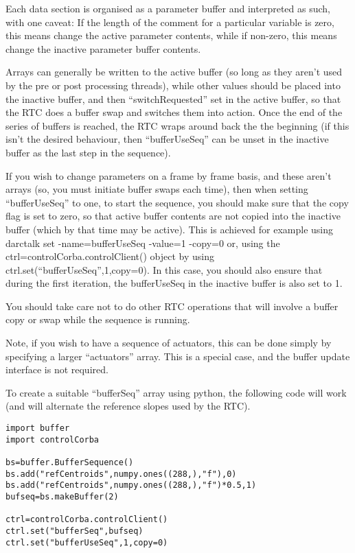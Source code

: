 \documentclass[a4,10pt]{article}
\begin{document}
Each data section is organised as a parameter buffer and interpreted
as such, with one caveat:  If the length of the comment for a
particular variable is zero, this means change the active parameter
contents, while if non-zero, this means change the inactive parameter
buffer contents.

Arrays can generally be written to the active buffer (so long as they
aren't used by the pre or post processing threads), while other values
should be placed into the inactive buffer, and then
``switchRequested'' set in the active buffer, so that the RTC does a
buffer swap and switches them into action.  Once the end of the series
of buffers is reached, the RTC wraps around back the the beginning (if
this isn't the desired behaviour, then ``bufferUseSeq'' can be unset
in the inactive buffer as the last step in the sequence).  

If you wish to change parameters on a frame by frame basis, and these
aren't arrays (so, you must initiate buffer swaps each time), then
when setting ``bufferUseSeq'' to one, to start the sequence, you
should make sure that the copy flag is set to zero, so that active
buffer contents are not copied into the inactive buffer (which by that
time may be active).  This is achieved for example using
{\rm darctalk set -name=bufferUseSeq -value=1 -copy=0}  or, using the
{\rm ctrl=controlCorba.controlClient()} object by using {\rm
  ctrl.set(``bufferUseSeq'',1,copy=0)}.  In this case, you should also
ensure that during the first iteration, the bufferUseSeq in the
inactive buffer is also set to 1.

You should take care not to do other RTC operations that will involve
a buffer copy or swap while the sequence is running.

Note, if you wish to have a sequence of actuators, this can be done
simply by specifying a larger ``actuators'' array.  This is a special
case, and the buffer update interface is not required.

To create a suitable ``bufferSeq'' array using python, the following
code will work (and will alternate the reference slopes used by the RTC).

\begin{verbatim}
import buffer
import controlCorba

bs=buffer.BufferSequence()
bs.add("refCentroids",numpy.ones((288,),"f"),0)
bs.add("refCentroids",numpy.ones((288,),"f")*0.5,1)
bufseq=bs.makeBuffer(2)

ctrl=controlCorba.controlClient()
ctrl.set("bufferSeq",bufseq)
ctrl.set("bufferUseSeq",1,copy=0)
\end{verbatim}
\end{document}
